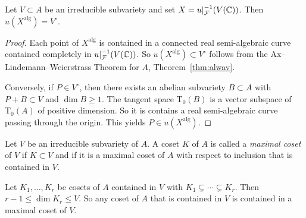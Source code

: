 \begin{theorem}
  \label{thm:imagealg}
  Let $V\subset A$ be an irreducible subvariety and set
  $X = u|_{{\mathcal F}}^{-1}(V({\mathbb{C}}))$. Then $u(X^{\mathrm{alg}}) = V^{\circ}$.
\end{theorem}
\begin{proof}
  Each point of $X^{\mathrm{alg}}$ is contained in a connected real
  semi-algebraic curve contained completely in
  $u|_{{\mathcal F}}^{-1}(V({\mathbb{C}}))$. So $u(X^{\mathrm{alg}}) \subset V^{\circ}$
  follows from the
  Ax--Lindemann--Weierstrass Theorem for $A$, Theorem~\ref{thm:alwav}.

  Conversely, if $P\in V^{\circ}$, then there exists an abelian
  subvariety $B\subset A$ with $P+B \subset V$ and $\dim B \ge 1$. The
  tangent space $\mathrm{T}_0(B)$ is a vector subspace of
  $\mathrm{T}_0(A)$ of positive dimension. So it is contains a real
  semi-algebraic curve passing through the origin. This yields
  $P\in u(X^{\mathrm{alg}})$. 
\end{proof}


\begin{definition}
  Let $V$ be an irreducible subvariety of $A$. A coset $K$ of $A$ is
  called a \emph{maximal coset} of $V$ if $K\subset V$ and if it is
  a maximal coset of $A$ with respect to inclusion that is contained
  in $V$. 
\end{definition}

Let $K_1,\ldots,K_r$ be cosets of $A$ contained in $V$ with
$K_1\subsetneq \cdots\subsetneq K_r$. Then $r-1\le \dim K_r\le V$. So
any coset of $A$ that is contained in $V$ is contained in a maximal
coset of $V$.

